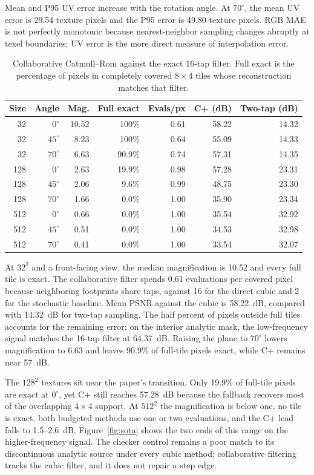 \documentclass[a4paper,11pt]{article}
\begin{document}
Mean and P95 UV error increase with the rotation angle. At $70^\circ$, the mean UV error is 29.54 texture pixels and the P95 error is 49.80 texture pixels. RGB MAE is not perfectly monotonic because nearest-neighbor sampling changes abruptly at texel boundaries; UV error is the more direct measure of interpolation error.

\begin{table}[H]
\centering
\caption{Collaborative Catmull--Rom against the exact 16-tap filter. Full exact is the percentage of pixels in completely covered $8\times4$ tiles whose reconstruction matches that filter.}
\label{tab:sota}
\small
\begin{tabular}{rrrrrrr}
\toprule
Size & Angle & Mag. & Full exact & Evals/px & C+ (dB) & Two-tap (dB) \\
\midrule
32 & $0^\circ$ & 10.52 & 100\% & 0.61 & 58.22 & 14.32 \\
32 & $45^\circ$ & 8.23 & 100\% & 0.64 & 55.09 & 14.33 \\
32 & $70^\circ$ & 6.63 & 90.9\% & 0.74 & 57.31 & 14.35 \\
128 & $0^\circ$ & 2.63 & 19.9\% & 0.98 & 57.28 & 23.31 \\
128 & $45^\circ$ & 2.06 & 9.6\% & 0.99 & 48.75 & 23.30 \\
128 & $70^\circ$ & 1.66 & 0.0\% & 1.00 & 35.90 & 23.34 \\
512 & $0^\circ$ & 0.66 & 0.0\% & 1.00 & 35.54 & 32.92 \\
512 & $45^\circ$ & 0.51 & 0.0\% & 1.00 & 34.53 & 32.98 \\
512 & $70^\circ$ & 0.41 & 0.0\% & 1.00 & 33.54 & 32.07 \\
\bottomrule
\end{tabular}
\end{table}

At $32^2$ and a front-facing view, the median magnification is 10.52 and every full tile is exact. The collaborative filter spends 0.61 evaluations per covered pixel because neighboring footprints share taps, against 16 for the direct cubic and 2 for the stochastic baseline. Mean PSNR against the cubic is 58.22~dB, compared with 14.32~dB for two-tap sampling. The half percent of pixels outside full tiles accounts for the remaining error: on the interior analytic mask, the low-frequency signal matches the 16-tap filter at 64.37~dB. Raising the plane to $70^\circ$ lowers magnification to 6.63 and leaves 90.9\% of full-tile pixels exact, while C+ remains near 57~dB.

The $128^2$ textures sit near the paper's transition. Only 19.9\% of full-tile pixels are exact at $0^\circ$, yet C+ still reaches 57.28~dB because the fallback recovers most of the overlapping $4\times4$ support. At $512^2$ the magnification is below one, no tile is exact, both budgeted methods use one or two evaluations, and the C+ lead falls to 1.5--2.6~dB. Figure~\ref{fig:sota} shows the two ends of this range on the higher-frequency signal. The checker control remains a poor match to its discontinuous analytic source under every cubic method; collaborative filtering tracks the cubic filter, and it does not repair a step edge.
\end{document}
